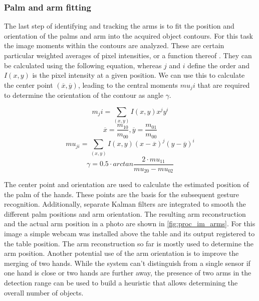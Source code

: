 \subsubsection{Palm and arm fitting}
The last step of identifying and tracking the arms is to fit the position and orientation of the palms and arm into the acquired object contours. For this task the image moments within the contours are analyzed. These are certain particular weighted averages of pixel intensities, or a function thereof \cite{hu1962visual}. They can be calculated using the following equation, whereas $j$ and $i$ define the order and $I(x,y)$ is the pixel intensity at a given position. We can use this to calculate the center point $(\overline{x},\overline{y})$, leading to the central moments $mu_ji$ that are required to determine the orientation of the contour as angle $\gamma$.

\begin{equation}
m_ji=\sum_{(x,y)}{I(x,y)x^jy^i}
\end{equation}
\begin{equation}
\overline{x}=\frac{m_10}{m_00}, \overline{y}=\frac{m_01}{m_00}
\end{equation}
\begin{equation}
mu_{ji}=\sum_{(x,y)}{I(x,y)(x-\overline{x})^j(y-\overline{y})^i}
\end{equation}
\begin{equation}
\gamma=0.5\cdot arctan\frac{2\cdot{mu_{11}}}{mu_{20}-mu_{02}}
\end{equation}
 
The center point and orientation are used to calculate the estimated position of the palm of the hands. These points are the basis for the subsequent gesture recognition. Additionally, separate Kalman filters are integrated to smooth the different palm positions and arm orientation. The resulting arm reconstruction and the actual arm position in a photo are shown in \ref{fig:proc_im_arms}. For this image a simple webcam was installed above the table and its output registered to the table position. 
The arm reconstruction so far is mostly used to determine the arm position. Another potential use of the arm orientation is to improve the merging of two hands. While the system can't distinguish from a single sensor if one hand is close or two hands are further away, the presence of two arms in the detection range can be used to build a heuristic that allows determining the overall number of objects. 
